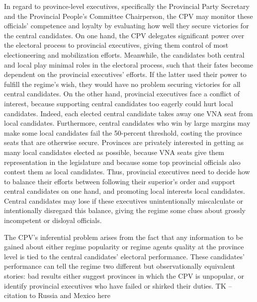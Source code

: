 \documentclass[12pt]{article}
\newcommand{\1}{\mathbbm{1}}
\begin{document}
In regard to province-level executives, specifically the Provincial Party Secretary and the Provincial People's Committee Chairperson, the CPV may monitor these officials' competence and loyalty by evaluating how well they secure victories for the central candidates. On one hand, the CPV delegates significant power over the electoral process to provincial executives, giving them control of most electioneering and mobilization efforts. Meanwhile, the candidates both central and local play minimal roles in the electoral process, such that their fates become dependent on the provincial executives' efforts. If the latter used their power to fulfill the regime's wish, they would have no problem securing victories for all central candidates. On the other hand, provincial executives face a conflict of interest, because supporting central candidates too eagerly could hurt local candidates. Indeed, each elected central candidate takes away one VNA seat from local candidates. Furthermore, central candidates who win by large margins may make some local candidates fail the 50-percent threshold, costing the province seats that are otherwise secure. Provinces are privately interested in getting as many local candidates elected as possible, because VNA seats give them representation in the legislature and because some top provincial officials also contest them as local candidates. Thus, provincial executives need to decide how to balance their efforts between following their superior's order and support central candidates on one hand, and promoting local interests local candidates. Central candidates may lose if these executives unintentionally miscalculate or intentionally disregard this balance, giving the regime some clues about grossly incompetent or disloyal officials. 

The CPV's inferential problem arises from the fact that any information to be gained about either regime popularity or regime agents quality at the province level is tied to the central candidates' electoral performance. These candidates' performance can tell the regime two different but observationally equivalent stories: bad results either suggest provinces in which the CPV is unpopular, or identify provincial executives who have failed or shirked their duties. TK -- citation to Russia and Mexico here
\end{document}
